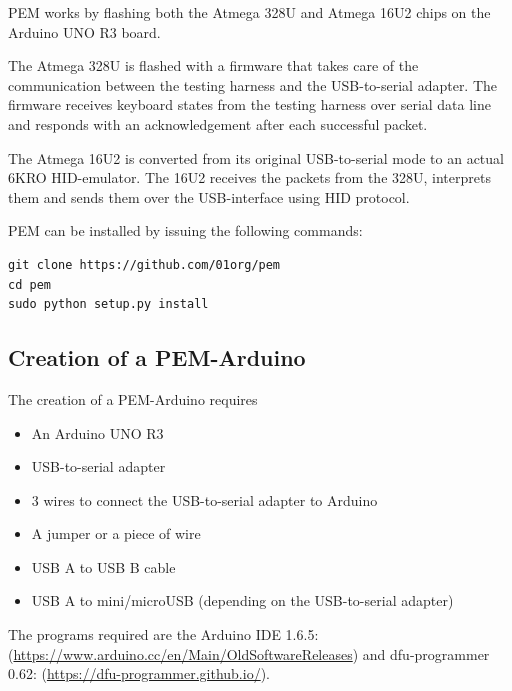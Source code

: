 \documentclass[a4paper,11pt]{article}
\begin{document}
PEM works by flashing both the Atmega 328U and Atmega 16U2 chips on the Arduino UNO R3 board. 

The Atmega 328U is flashed with a firmware that takes care of the communication between the testing harness and the USB-to-serial adapter. The firmware receives keyboard states from the testing harness over serial data line and responds with an acknowledgement after each successful packet.

The Atmega 16U2 is converted from its original USB-to-serial mode to an actual 6KRO HID-emulator. The 16U2 receives the packets from the 328U, interprets them and sends them over the USB-interface using HID protocol.

PEM can be installed by issuing the following commands:
\begin{lstlisting}
git clone https://github.com/01org/pem
cd pem
sudo python setup.py install
\end{lstlisting}

\subsection{Creation of a PEM-Arduino}
\label{pemarduino}
The creation of a PEM-Arduino requires 
\begin{itemize}
\item An Arduino UNO R3
\item USB-to-serial adapter
\item 3 wires to connect the USB-to-serial adapter to Arduino
\item A jumper or a piece of wire
\item USB A to USB B cable
\item USB A to mini/microUSB (depending on the USB-to-serial adapter)
\end{itemize}

The programs required are the Arduino IDE 1.6.5: (\url{https://www.arduino.cc/en/Main/OldSoftwareReleases}) and dfu-programmer 0.62: (\url{https://dfu-programmer.github.io/}).
\end{document}

